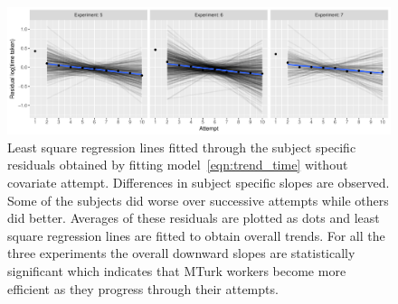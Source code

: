 \documentclass[10pt]{article}\usepackage[]{graphicx}\usepackage[]{xcolor}
\begin{document}
\begin{figure}[htbp] 
   \centering
 \includegraphics[width=6.3in]{learning_trend_time_subject.pdf}    
   \caption{Least square regression lines fitted through the subject specific residuals obtained by  fitting model~\eqref{eqn:trend_time} without covariate attempt. Differences in subject specific slopes are observed. Some of the subjects did worse over successive attempts while others did better. Averages of these residuals are plotted as dots and least square regression lines are fitted to obtain overall trends. For all the three experiments the overall downward slopes are statistically significant which indicates that MTurk workers become more efficient as they progress through their attempts.}
   \label{fig:learning_trend_time}
\end{figure}
\end{document}
